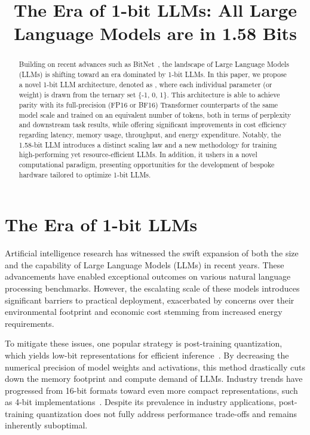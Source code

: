 \title{The Era of 1-bit LLMs: All Large Language Models are in 1.58 Bits}

\begin{abstract}
Building on recent advances such as BitNet~\cite{bitnet}, the landscape of Large Language Models (LLMs) is shifting toward an era dominated by 1-bit LLMs. In this paper, we propose a novel 1-bit LLM architecture, denoted as \textbf{}, where each individual parameter (or weight) is drawn from the ternary set \{-1, 0, 1\}. This architecture is able to achieve parity with its full-precision (FP16 or BF16) Transformer counterparts of the same model scale and trained on an equivalent number of tokens, both in terms of perplexity and downstream task results, while offering significant improvements in cost efficiency regarding latency, memory usage, throughput, and energy expenditure. Notably, the 1.58-bit LLM introduces a distinct scaling law and a new methodology for training high-performing yet resource-efficient LLMs. In addition, it ushers in a novel computational paradigm, presenting opportunities for the development of bespoke hardware tailored to optimize 1-bit LLMs.
\end{abstract}

\section{The Era of 1-bit LLMs}

Artificial intelligence research has witnessed the swift expansion of both the size and the capability of Large Language Models (LLMs) in recent years. These advancements have enabled exceptional outcomes on various natural language processing benchmarks. However, the escalating scale of these models introduces significant barriers to practical deployment, exacerbated by concerns over their environmental footprint and economic cost stemming from increased energy requirements.

To mitigate these issues, one popular strategy is post-training quantization, which yields low-bit representations for efficient inference~\cite{smoothquant, gptq, quip, quip_sharp}. By decreasing the numerical precision of model weights and activations, this method drastically cuts down the memory footprint and compute demand of LLMs. Industry trends have progressed from 16-bit formats toward even more compact representations, such as 4-bit implementations~\cite{gptq, awq}. Despite its prevalence in industry applications, post-training quantization does not fully address performance trade-offs and remains inherently suboptimal.

